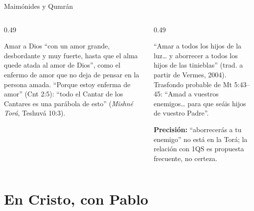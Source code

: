 \documentclass[hyperref={bookmarks=false},aspectratio=169]{beamer}
\newcommand{\precision}[1]{{\footnotesize\color{gris}\textbf{Precisión:} #1}}
\begin{document}
\begin{frame}{Maimónides y Qumrán}
\begin{columns}[t,onlytextwidth]
\begin{column}{0.49\textwidth}
\begin{tcolorbox}[colback=papiro,colframe=azul,boxrule=0.8pt,arc=3pt,title={Maimónides: el enfermo de amor},coltitle=papiro,colbacktitle=azul,fonttitle=\scriptsize\bfseries]
\scriptsize Amar a Dios ``con un amor grande, desbordante y muy fuerte, hasta que el alma quede atada al amor de Dios'', como el enfermo de amor que no deja de pensar en la persona amada. ``Porque estoy enferma de amor'' (Cnt 2:5): ``todo el Cantar de los Cantares es una parábola de esto'' (\emph{Mishné Torá}, Teshuvá 10:3).
\end{tcolorbox}
\end{column}
\begin{column}{0.49\textwidth}
\begin{tcolorbox}[colback=papiro,colframe=azul,boxrule=0.8pt,arc=3pt,title={Qumrán: 1QS I 9--10},coltitle=papiro,colbacktitle=azul,fonttitle=\scriptsize\bfseries]
\scriptsize ``Amar a todos los hijos de la luz\ldots{} y aborrecer a todos los hijos de las tinieblas'' (trad. a partir de Vermes, 2004). Trasfondo probable de Mt 5:43--45: ``Amad a vuestros enemigos\ldots{} para que seáis hijos de vuestro Padre''.
\end{tcolorbox}
\precision{``aborrecerás a tu enemigo'' no está en la Torá; la relación con 1QS es propuesta frecuente, no certeza.}
\end{column}
\end{columns}
\end{frame}

\section{En Cristo, con Pablo}
\end{document}
